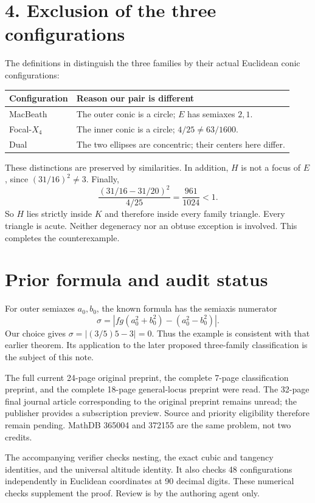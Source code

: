 \documentclass[11pt]{article}
\begin{document}
\section*{4. Exclusion of the three configurations}
The definitions in \cite[Sections 3--4]{special} distinguish the three
families by their actual Euclidean conic configurations:

\begin{center}
\begin{tabular}{ll}
Configuration & Reason our pair is different\\ \hline
MacBeath & The outer conic is a circle; $E$ has semiaxes $2,1$.\\
Focal-$X_4$ & The inner conic is a circle; $4/25\ne63/1600$.\\
Dual & The two ellipses are concentric; their centers here differ.
\end{tabular}
\end{center}

These distinctions are preserved by similarities. In addition,
$H$ is not a focus of $E$, since $(31/16)^2\ne3$.
Finally,
\[
             \frac{(31/16-31/20)^2}{4/25}
                    =\frac{961}{1024}<1.
\]
So $H$ lies strictly inside $K$ and therefore inside every family
triangle. Every triangle is acute. Neither degeneracy nor an obtuse
exception is involved. This completes the counterexample.

\section*{Prior formula and audit status}
For outer semiaxes $a_0,b_0$, the known formula
\cite[Theorem 3]{general} has the semiaxis numerator
\[
 \sigma=\left|fg(a_0^2+b_0^2)-(a_0^2-b_0^2)\right|.
\]
Our choice gives $\sigma=|(3/5)5-3|=0$. Thus the example is consistent
with that earlier theorem. Its application to the later proposed
three-family classification is the subject of this note.

\newpage
The full current 24-page original preprint, the complete 7-page
classification preprint, and the complete 18-page general-locus preprint
were read. The 32-page final journal article corresponding to the
original preprint remains unread; the publisher provides a subscription
preview. Source and priority eligibility therefore remain pending.
MathDB 365004 and 372155 are the same problem, not two credits.

The accompanying verifier checks nesting, the exact cubic and tangency
identities, and the universal altitude identity. It also checks
48 configurations independently in Euclidean coordinates at 90 decimal
digits. These numerical checks supplement the proof.
Review is by the authoring agent only.
\end{document}
